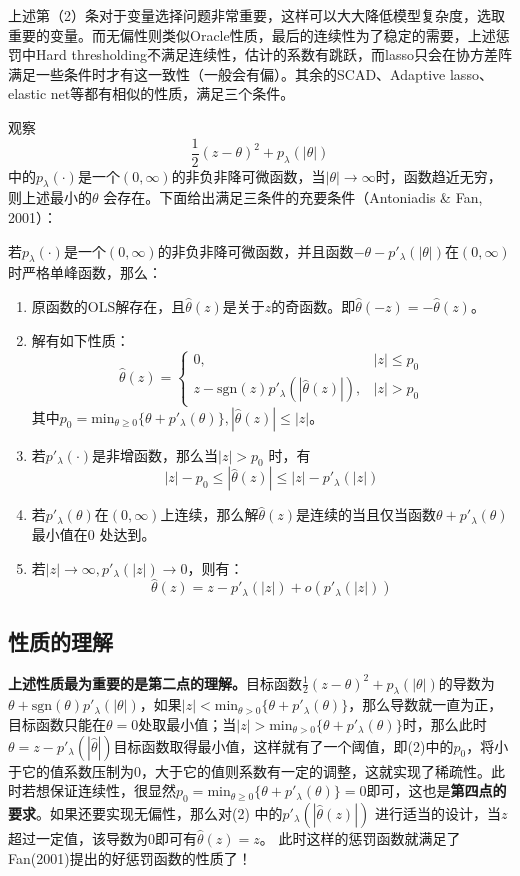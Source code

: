 ﻿\documentclass[hyperref,12pt]{ctexart}
\begin{document}
上述第（2）条对于变量选择问题非常重要，这样可以大大降低模型复杂度，选取重要的变量。而无偏性则类似Oracle性质，最后的连续性为了稳定的需要，上述惩罚中Hard thresholding不满足连续性，估计的系数有跳跃，而lasso只会在协方差阵满足一些条件时才有这一致性（一般会有偏）。其余的SCAD、Adaptive lasso、elastic net等都有相似的性质，满足三个条件。

观察\[
\frac{1}{2}(z - \theta)^2 + p_{\lambda}(|\theta|)
\]
中的$p_{\lambda}(\cdot)$是一个$(0, \infty)$的非负非降可微函数，当$|\theta|\rightarrow \infty$时，函数趋近无穷，则上述最小的$\theta$ 会存在。下面给出满足三条件的充要条件（Antoniadis \& Fan, 2001）：

若$p_{\lambda}(\cdot)$是一个$(0, \infty)$的非负非降可微函数，并且函数$-\theta - p'_{\lambda}(|\theta|)$在$(0, \infty)$时严格单峰函数，那么：
\begin{enumerate}[(1)]
	\item 原函数的OLS解存在，且$\hat{\theta}(z)$是关于$z$的奇函数。即$\hat{\theta}(-z) = -\hat{\theta}(z)$。
	\item 解有如下性质：
	\[
	\hat{\theta}(z) = \left\{\begin{array}{lr}
	0, & |z| \leq p_0 \\
	z - \text{sgn}(z)p'_{\lambda}(|\hat{\theta}(z)|), & |z| > p_0
	\end{array}
	\right.
	\]
	其中$p_0 = \text{min}_{\theta \geq 0}\{\theta + p'_{\lambda}(\theta)\}, |\hat{\theta}(z)| \leq |z|$。
	\item 若$p'_{\lambda}(\cdot)$是非增函数，那么当$|z| > p_0$ 时，有
	$$|z| - p_0 \leq |\hat{\theta}(z)| \leq |z| - p'_{\lambda}(|z|)$$
	\item 若$p'_{\lambda}(\theta)$在$(0, \infty)$上连续，那么解$\hat{\theta}(z)$是连续的当且仅当函数$\theta + p'_{\lambda}(\theta)$最小值在0 处达到。
	\item 若$|z| \rightarrow \infty, p'_{\lambda}(|z|) \rightarrow 0$，则有：
	$$\hat{\theta}(z) = z - p'_{\lambda}(|z|) + o(p'_{\lambda}(|z|))$$	
\end{enumerate}

\subsection{性质的理解}
\textbf{上述性质最为重要的是第二点的理解。}目标函数$\frac{1}{2}(z - \theta)^2 + p_{\lambda}(|\theta|)$的导数为$\theta + \text{sgn}(\theta)p'_{\lambda}(|\theta|)$，如果$|z| < \text{min}_{\theta > 0}\{\theta + p'_{\lambda}(\theta)\}$，那么导数就一直为正，目标函数只能在$\theta = 0$处取最小值；当$|z| > \text{min}_{\theta > 0}\{\theta + p'_{\lambda}(\theta)\}$时，那么此时$\theta = z - p'_{\lambda}(|\hat{\theta}|)$目标函数取得最小值，这样就有了一个阈值，即(2)中的$p_0$，将小于它的值系数压制为0，大于它的值则系数有一定的调整，这就实现了稀疏性。此时若想保证连续性，很显然$p_0 = \text{min}_{\theta \geq 0}\{\theta + p'_{\lambda}(\theta)\} = 0$即可，这也是\textbf{第四点的要求}。如果还要实现无偏性，那么对(2) 中的$p'_{\lambda}(|\hat{\theta}(z)|)$ 进行适当的设计，当$z$ 超过一定值，该导数为0即可有$\hat{\theta}(z) = z$。 此时这样的惩罚函数就满足了Fan(2001)提出的好惩罚函数的性质了！
\end{document}
